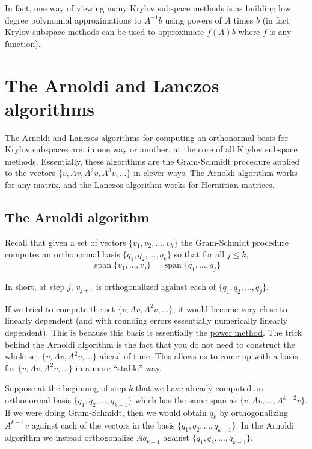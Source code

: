 \documentclass[10pt]{article}
\begin{document}
In fact, one way of viewing many Krylov subspace methods is as building low degree polynomial approximations to \(A^{-1}b\) using powers of \(A\) times \(b\) (in fact Krylov subspace methods can be used to approximate \(f(A)b\) where \(f\) is any \href{./current_research.html}{function}).

\section{The Arnoldi and Lanczos algorithms}

The Arnoldi and Lanczos algorithms for computing an orthonormal basis for Krylov subspaces are, in one way or another, at the core of all Krylov subspace methods.
Essentially, these algorithms are the Gram-Schmidt procedure applied to the vectors \(\{v,Av,A^2v,A^3v,\ldots\}\) in clever ways.
The Arnoldi algorithm works for any matrix, and the Lanczos algorithm works for Hermitian matrices.

\subsection{The Arnoldi algorithm}

Recall that given a set of vectors \(\{v_1,v_2,\ldots, v_k\}\) the Gram-Schmidt procedure computes an orthonormal basis \(\{q_1,q_2,\ldots,q_k\}\) so that for all \(j\leq k\),
\[
\operatorname{span}\{v_1,\ldots,v_j\} = \operatorname{span}\{q_1,\ldots,q_j\}
\]

In short, at step \(j\), \(v_{j+1}\) is orthogonalized against each of \(\{q_1,q_2,\ldots, q_j\}\).

If we tried to compute the set \(\{v,Av,A^2v,\ldots\}\), it would become very close to linearly dependent (and with rounding errors essentially numerically linearly dependent).
This is because this basis is essentially the \href{https://en.wikipedia.org/wiki/Power_iteration}{power method}.
The trick behind the Arnoldi algorithm is the fact that you do not need to construct the whole set \(\{v,Av,A^2v,\ldots\}\) ahead of time.
This allows us to come up with a basis for \(\{v,Av,A^2v,\ldots\}\) in a more ``stable'' way.

Suppose at the beginning of step \(k\) that we have already computed an orthonormal basis \(\{q_1,q_2,\ldots,q_{k-1}\}\) which has the same span as \(\{v,Av,\ldots, A^{k-2}v\}\).
If we were doing Gram-Schmidt, then we would obtain \(q_k\) by orthogonalizing \(A^{k-1}v\) against each of the vectors in the basis \(\{q_1,q_2, \ldots, q_{k-1}\}\).
In the Arnoldi algorithm we instead orthogonalize \(Aq_{k-1}\) against \(\{q_1,q_2,\ldots, q_{k-1}\}\).
\end{document}
